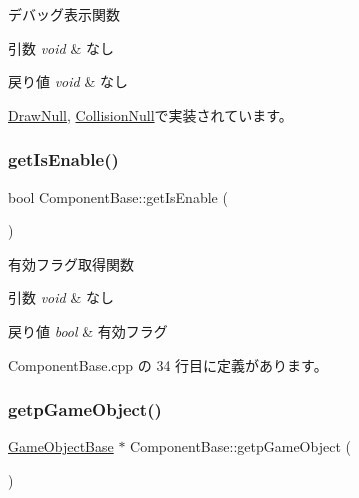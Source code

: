 デバッグ表示関数 


\begin{DoxyParams}{引数}
{\em void} & なし \\
\hline
\end{DoxyParams}

\begin{DoxyRetVals}{戻り値}
{\em void} & なし \\
\hline
\end{DoxyRetVals}


\mbox{\hyperlink{class_draw_null_aed3bbedfe8db8daf7cafa143750f2114}{Draw\+Null}}, \mbox{\hyperlink{class_collision_null_a098fcf2c8ecc3c31706b720fbe852aca}{Collision\+Null}}で実装されています。

\mbox{\label{class_component_base_a36f289382f4dd0187a6f355e06c5c08e}} 
\subsubsection{\texorpdfstring{get\+Is\+Enable()}{getIsEnable()}}
{\footnotesize\ttfamily bool Component\+Base\+::get\+Is\+Enable (\begin{DoxyParamCaption}{ }\end{DoxyParamCaption})}



有効フラグ取得関数 


\begin{DoxyParams}{引数}
{\em void} & なし \\
\hline
\end{DoxyParams}

\begin{DoxyRetVals}{戻り値}
{\em bool} & 有効フラグ \\
\hline
\end{DoxyRetVals}


 Component\+Base.\+cpp の 34 行目に定義があります。

\mbox{\label{class_component_base_ab9517b92e45e084b1cc450c147e16642}} 
\subsubsection{\texorpdfstring{getp\+Game\+Object()}{getpGameObject()}}
{\footnotesize\ttfamily \mbox{\hyperlink{class_game_object_base}{Game\+Object\+Base}} $\ast$ Component\+Base\+::getp\+Game\+Object (\begin{DoxyParamCaption}{ }\end{DoxyParamCaption})}



